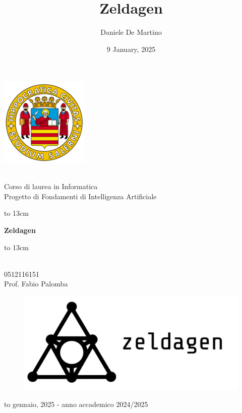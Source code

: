 \documentclass[12pt,titlepage]{article}
\title{Zeldagen}
\author{Daniele De Martino}
\date{9 January, 2025}
\begin{document}
\begin{titlepage}
  \begin{center}
    \centerline{\includegraphics[height=42mm]{assets/logo-unisa.png}}

    \vspace{0.5cm}
    { \\ Corso di laurea in Informatica}\\[1em]

    \vspace{1cm}
    {\sc \large Progetto di Fondamenti di Intelligenza Artificiale}

    \vspace{0.2cm}
    \centerline{\hbox to 13cm{\hrulefill}}
    \vspace{0.3cm}
    {\sc \Large {\textbf{Zeldagen}}}
    \centerline{\hbox to 13cm{\hrulefill}}

    \vspace{1.2cm}
    {\\
    0512116151 \\ [1 cm]
    \large Prof. Fabio Palomba}

    \vspace{3cm}

    \begin{figure}[h]
    \centering
    \begin{minipage}{.5\textwidth}
    \centering
    \includegraphics[width=.7\linewidth]{assets/zeldagen-logo-transparent-long.png}
    \end{minipage}%
    \end{figure}

    \vspace{0.3cm}

    \hbox to \textwidth{\hrulefill}
    \vspace{0.2cm}
    {\sc  gennaio, 2025 - anno accademico 2024/2025}

  \end{center}
\end{titlepage}
\end{document}

